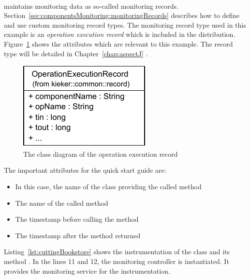 
\quad\

\noindent \Kieker{} maintains monitoring data as  so-called monitoring records. %
Section~\ref{sec:componentsMonitoring:monitoringRecords} describes how to define and use custom monitoring record types. %
The monitoring record type used in this example is an \textit{operation execution record} which %
is included in the \Kieker{} distribution. %
Figure~\ref{fig:OperationExecutionRecordClassDiagram} shows the %
attributes which  are relevant to this example. %
The record type will be detailed in Chapter~\ref{chap:aspectJ} .

\begin{figure}[H]
\begin{centering}
\includegraphics[scale=1]{images/kieker_OperationExecutionRecord-notraceattributes}%
\caption{The class diagram of the operation execution record}
\label{fig:OperationExecutionRecordClassDiagram}
\end{centering}
\end{figure}

\noindent The important attributes for the quick start guide are:

\begin{itemize}
\item[\hskip1em\class{componentName:}] In this case, the name of the class %
providing the called method
\item[\hskip1em\class{opName:}] The name of the called method
\item[\hskip1em\class{tin:}] The timestamp before calling the method
\item[\hskip1em\class{tout:}] The timestamp after the method returned
\end{itemize}

\noindent Listing~\ref{lst:cuttingBookstore} shows the instrumentation of the  class and its method . In the lines 11 and 12, the monitoring controller is instantiated. It provides the monitoring service for the instrumentation.

